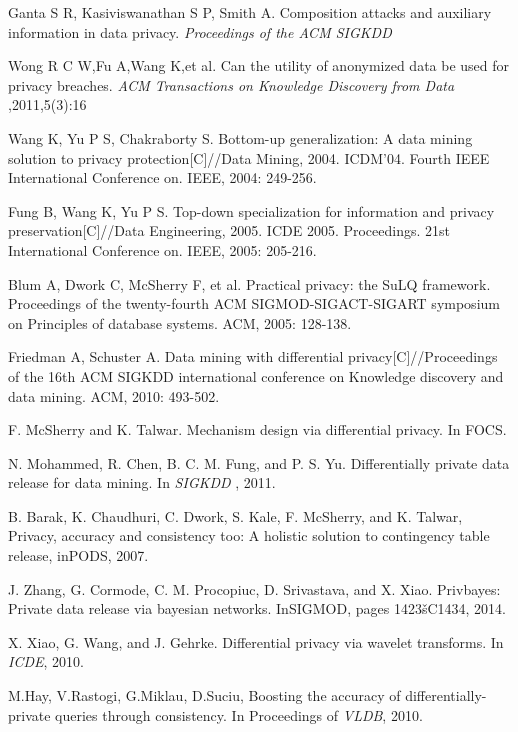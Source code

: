 \begin{thebibliography}{1}
 Ganta S R, Kasiviswanathan S P, Smith A. Composition attacks and auxiliary information in data privacy. {\it Proceedings of the ACM SIGKDD}

 Wong R C W,Fu A,Wang K,et al. Can the utility of anonymized data be used for privacy breaches. {\it ACM Transactions on Knowledge Discovery from Data },2011,5(3):16

Wang K, Yu P S, Chakraborty S. Bottom-up generalization: A data mining solution to privacy protection[C]//Data Mining, 2004. ICDM'04. Fourth IEEE International Conference on. IEEE, 2004: 249-256.

Fung B, Wang K, Yu P S. Top-down specialization for information and privacy preservation[C]//Data Engineering, 2005. ICDE 2005. Proceedings. 21st International Conference on. IEEE, 2005: 205-216.

Blum A, Dwork C, McSherry F, et al. Practical privacy: the SuLQ framework. Proceedings of the twenty-fourth ACM SIGMOD-SIGACT-SIGART symposium on Principles of database systems. ACM, 2005: 128-138.

Friedman A, Schuster A. Data mining with differential privacy[C]//Proceedings of the 16th ACM SIGKDD international conference on Knowledge discovery and data mining. ACM, 2010: 493-502.

F. McSherry and K. Talwar. Mechanism design via differential privacy. In FOCS.

N. Mohammed, R. Chen, B. C. M. Fung, and P. S. Yu. Differentially private data release for data mining. In {\it SIGKDD }, 2011.

B. Barak, K. Chaudhuri, C. Dwork, S. Kale, F. McSherry, and K. Talwar, Privacy, accuracy and consistency too: A holistic solution to contingency table release, inPODS, 2007.

J. Zhang, G. Cormode, C. M. Procopiuc, D. Srivastava, and X. Xiao. Privbayes: Private data
release via bayesian networks. InSIGMOD, pages 1423šC1434, 2014.

 X. Xiao, G. Wang, and J. Gehrke. Differential privacy via wavelet transforms. In {\it ICDE}, 2010.

 M.Hay, V.Rastogi, G.Miklau, D.Suciu, Boosting the accuracy of differentially-private queries through consistency. In Proceedings of {\it VLDB},  2010.






\end{thebibliography}
